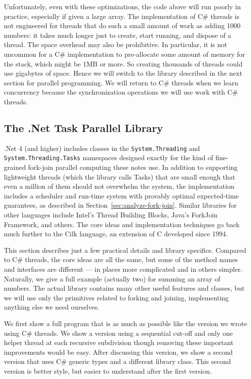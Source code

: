 \documentclass[10pt]{article}
\begin{document}
Unfortunately, even with these optimizations, the code above will run
poorly in practice, especially if given a large array.  The
implementation of C\# threads is not engineered for threads that do
such a small amount of work as adding 1000 numbers: it takes much
longer just to create, start running, and dispose of a thread.
The space overhead may also be prohibitive. In particular, it is not
uncommon for a C\# implementation to pre-allocate some amount of memory 
for the stack, which might be 1MB or more.  So
creating thousands of threads could use gigabytes of space.  Hence we
will switch to the library described in the next section for parallel
programming.  We will return to C\# threads when we learn
concurrency because the synchronization operations we will use work
with C\# threads.

\subsection{The .Net Task Parallel Library}
\label{sec:dotnet-tpl}

.Net 4 (and higher) includes classes in the {\tt System.Threading} and {\tt System.Threading.Tasks} namespaces
designed exactly for the kind of fine-grained fork-join parallel
computing these notes use.  In addition to supporting lightweight
threads (which the library calls Tasks) that are small enough
that even a million of them should not overwhelm the system, the
implementation includes a scheduler and run-time system with provably
optimal expected-time guarantees, as described in
Section~\ref{sec:analyze-fork-join}.  Similar libraries for other
languages include Intel's Thread Building Blocks, Java's ForkJoin Framework, 
and others.  The core ideas and
implementation techniques go back much further to the Cilk language,
an extension of C developed since 1994.

This section describes just a few practical details and library
specifics.  Compared to C\# threads, the core ideas are all the same,
but some of the method names and interfaces are different --- in
places more complicated and in others simpler.  Naturally, we give a
full example (actually two) for summing an array of numbers.  The
actual library contains many other useful features and classes, but we
will use only the primitives related to forking and joining,
implementing anything else we need ourselves.

We first show a full program that is as
much as possible like the version we wrote using C\# threads.  We
show a version using a sequential cut-off and only one helper thread
at each recursive subdivision though removing these important
improvements would be easy.  After discussing this version, we show a
second version that uses C\# generic types and a different library
class.  This second version is better style, but easier to understand
after the first version.
\end{document}
